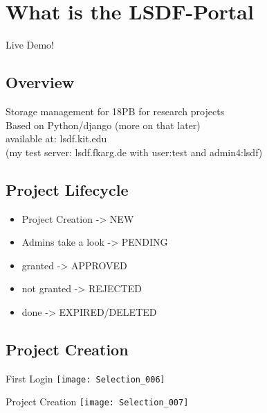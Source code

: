 \section{What is the LSDF-Portal}

\begin{frame}[standout]
    \Large
    Live Demo!
\end{frame}


\subsection{Overview}

\begin{frame}[c]
    Storage management for 18PB for research projects \\
    Based on Python/django (more on that later) \\
    available at: lsdf.kit.edu \\
    (my test server: lsdf.fkarg.de with user:test and admin4:lsdf) \\
\end{frame}

\subsection{Project Lifecycle}
\begin{frame}[c]
    \begin{itemize}[<+(1)->]
        \item Project Creation -> NEW
        \item Admins take a look -> PENDING
        \item granted -> APPROVED
        \item not granted -> REJECTED
        \item done -> EXPIRED/DELETED
    \end{itemize}
\end{frame}

\subsection{Project Creation}

\begin{frame}[c]{First Login}
    \texttt{[image: Selection\_006]}
\end{frame}

\begin{frame}[c]{Project Creation}
    \texttt{[image: Selection\_007]}
\end{frame}

